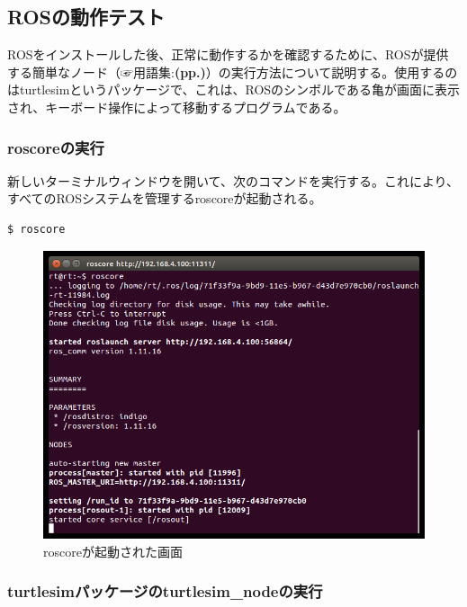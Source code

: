 \subsection{ROSの動作テスト}

ROSをインストールした後、正常に動作するかを確認するために、ROSが提供する簡単なノード（☞用語集:\textbf{(pp.\pageref{section:terms})}）の実行方法について説明する。使用するのはturtlesimというパッケージで、これは、ROSのシンボルである亀が画面に表示され、キーボード操作によって移動するプログラムである。

\subsubsection{roscoreの実行}

新しいターミナルウィンドウを開いて、次のコマンドを実行する。これにより、すべてのROSシステムを管理するroscoreが起動される。

\begin{lstlisting}[language=ROS]
$ roscore
\end{lstlisting}

\begin{figure}[h]
  \centering
  \includegraphics[width=0.9\columnwidth]{pictures/chapter2/pic_02_02.png}
  \caption{roscoreが起動された画面}
\end{figure}

\subsubsection{turtlesimパッケージのturtlesim\_nodeの実行}

